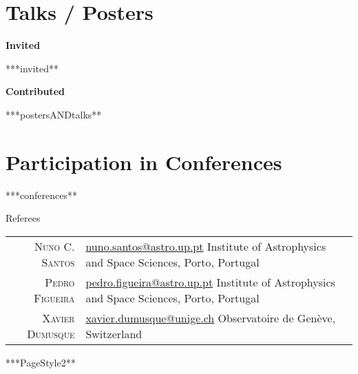 \documentclass[10pt]{article}
\renewcommand{\labelenumi}{-\label{A\theenumi}}
\begin{document}
\fi


\newpage
\section{Talks / Posters}

\textbf{Invited}
\begin{enumerate}

  ***invited**

\end{enumerate}

\textbf{Contributed}
\renewcommand{\labelenumi}{[P\arabic{enumi}] }
\begin{enumerate}

  ***postersANDtalks**

\end{enumerate}


\ifconferences

  \section{Participation in Conferences}
  \begin{itemize}

    ***conferences**

  \end{itemize}

\fi


\ifreferees

  \vspace{5cm}
  {\Large\scshape\raggedright\sffamily Referees}
  \newcommand{\service}[2]{
    \textsc{#1} & #2\\[1em]
  }
  \newcommand{\mail}[1]{
    \href{mailto:#1}{#1}
  }
  \begin{longtable}{r|p{10cm}}
    \service{Nuno C. Santos}{\mail{nuno.santos@astro.up.pt}\newline
                             Institute of Astrophysics and Space Sciences, Porto, Portugal}
    \service{Pedro Figueira}{\mail{pedro.figueira@astro.up.pt}\newline
                             Institute of Astrophysics and Space Sciences, Porto, Portugal}
    \service{Xavier Dumusque}{\mail{xavier.dumusque@unige.ch}\newline
                             Observatoire de Genève, Switzerland}
  \end{longtable}

\fi


***PageStyle2**
\end{document}
